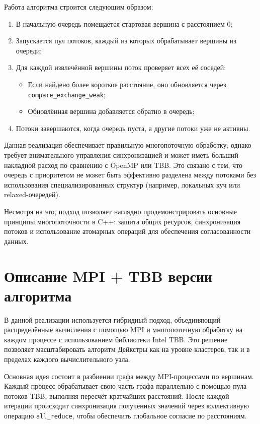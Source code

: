\documentclass[12pt,a4paper]{extarticle}
\begin{document}
Работа алгоритма строится следующим образом:

\begin{enumerate}
    \item В начальную очередь помещается стартовая вершина с расстоянием 0;
    \item Запускается пул потоков, каждый из которых обрабатывает вершины из очереди;
    \item Для каждой извлечённой вершины поток проверяет всех её соседей:
    \begin{itemize}
        \item Если найдено более короткое расстояние, оно обновляется через
        \texttt{compare\_exchange\_weak};
        \item Обновлённая вершина добавляется обратно в очередь;
    \end{itemize}
    \item Потоки завершаются, когда очередь пуста, а другие потоки уже не активны.
\end{enumerate}

Данная реализация обеспечивает правильную многопоточную обработку, однако требует
внимательного управления синхронизацией и может иметь больший накладной расход по сравнению
с OpenMP или TBB. Это связано с тем, что очередь с приоритетом не может быть эффективно
разделена между потоками без использования специализированных структур (например,
локальных куч или relaxed-очередей).

Несмотря на это, подход позволяет наглядно продемонстрировать основные принципы
многопоточности в C++: защита общих ресурсов, синхронизация потоков и использование
атомарных операций для обеспечения согласованности данных.

\section{Описание MPI + TBB версии алгоритма}

В данной реализации используется гибридный подход, объединяющий распределённые вычисления
с помощью MPI и многопоточную обработку на каждом процессе с использованием библиотеки
Intel TBB. Это решение позволяет масштабировать алгоритм Дейкстры как на уровне кластеров,
так и в пределах каждого вычислительного узла.

Основная идея состоит в разбиении графа между MPI-процессами по вершинам. Каждый процесс
обрабатывает свою часть графа параллельно с помощью пула потоков TBB, выполняя пересчёт
кратчайших расстояний. После каждой итерации происходит синхронизация полученных значений
через коллективную операцию \texttt{all\_reduce}, чтобы обеспечить глобальное согласие
по расстояниям.
\end{document}
